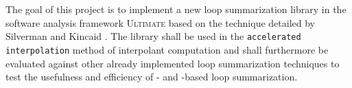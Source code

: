 
The goal of this project is to implement a new loop summarization library in the software analysis framework \textsc{Ultimate}\cite{Zitat02} based on the technique detailed by Silverman and Kincaid \cite{DBLP:conf/cav/SilvermanK19}. The library shall be used in the \texttt{accelerated interpolation} method of interpolant computation and shall furthermore be evaluated against other already implemented loop summarization techniques to test the usefulness and efficiency of \qvasr- and \qvasrs-based loop summarization.